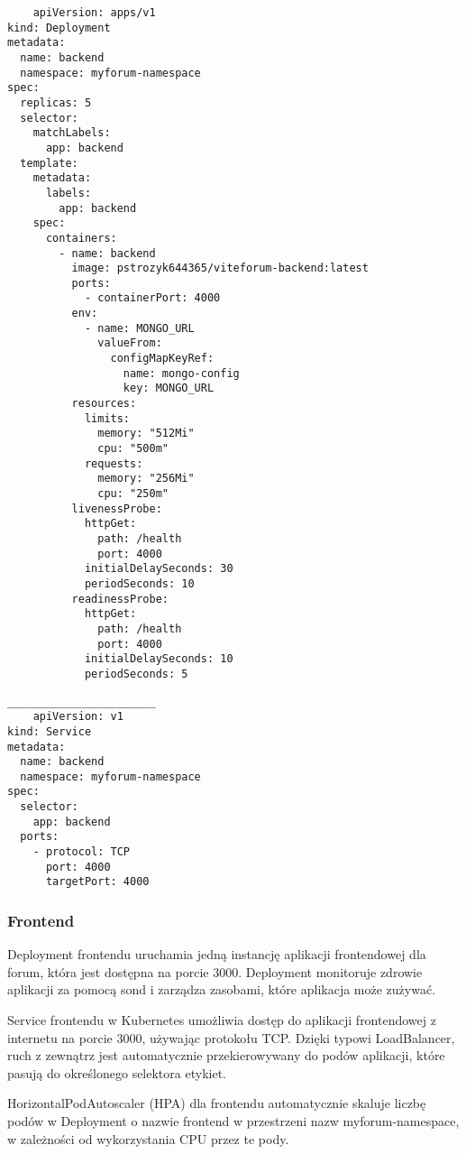 \documentclass[12pt,a4paper]{article}
\begin{document}
\begin{verbatim}
    apiVersion: apps/v1
kind: Deployment
metadata:
  name: backend
  namespace: myforum-namespace
spec:
  replicas: 5
  selector:
    matchLabels:
      app: backend
  template:
    metadata:
      labels:
        app: backend
    spec:
      containers:
        - name: backend
          image: pstrozyk644365/viteforum-backend:latest
          ports:
            - containerPort: 4000
          env:
            - name: MONGO_URL
              valueFrom:
                configMapKeyRef:
                  name: mongo-config
                  key: MONGO_URL
          resources:
            limits:
              memory: "512Mi"
              cpu: "500m"
            requests:
              memory: "256Mi"
              cpu: "250m"
          livenessProbe:
            httpGet:
              path: /health
              port: 4000
            initialDelaySeconds: 30
            periodSeconds: 10
          readinessProbe:
            httpGet:
              path: /health
              port: 4000
            initialDelaySeconds: 10
            periodSeconds: 5
\end{verbatim}

\begin{verbatim}
_______________________
    apiVersion: v1
kind: Service
metadata:
  name: backend
  namespace: myforum-namespace
spec:
  selector:
    app: backend
  ports:
    - protocol: TCP
      port: 4000
      targetPort: 4000
\end{verbatim}
\subsubsection{Frontend}
Deployment frontendu uruchamia jedną instancję aplikacji frontendowej dla forum, która jest dostępna na porcie 3000. Deployment monitoruje zdrowie aplikacji za pomocą sond i zarządza zasobami, które aplikacja może zużywać.

Service frontendu w Kubernetes umożliwia dostęp do aplikacji frontendowej z internetu na porcie 3000, używając protokołu TCP. Dzięki typowi LoadBalancer, ruch z zewnątrz jest automatycznie przekierowywany do podów aplikacji, które pasują do określonego selektora etykiet.

HorizontalPodAutoscaler (HPA) dla frontendu automatycznie skaluje liczbę podów w Deployment o nazwie frontend w przestrzeni nazw myforum-namespace, w zależności od wykorzystania CPU przez te pody.
\end{document}
